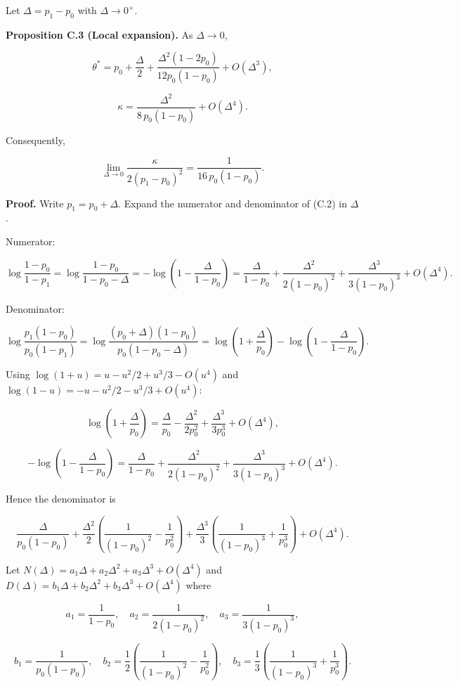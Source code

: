 \documentclass[
  12pt,
]{ctexart}
\begin{document}
Let \(\Delta = p_1 - p_0\) with \(\Delta \to 0^+\).

\textbf{Proposition C.3 (Local expansion).} As \(\Delta \to 0\),

\[
\theta^* = p_0 + \frac{\Delta}{2} + \frac{\Delta^2(1-2p_0)}{12 p_0(1-p_0)} + O(\Delta^3),
\]

\[
\kappa = \frac{\Delta^2}{8\,p_0(1-p_0)} + O(\Delta^4).
\]

Consequently,

\[
\lim_{\Delta\to 0} \frac{\kappa}{2(p_1-p_0)^2} = \frac{1}{16\,p_0(1-p_0)}.
\]

\textbf{Proof.} Write \(p_1 = p_0 + \Delta\). Expand the numerator and
denominator of (C.2) in \(\Delta\).

Numerator:

\[
\log\frac{1-p_0}{1-p_1} = \log\frac{1-p_0}{1-p_0-\Delta}
= -\log\!\left(1 - \frac{\Delta}{1-p_0}\right)
= \frac{\Delta}{1-p_0} + \frac{\Delta^2}{2(1-p_0)^2} + \frac{\Delta^3}{3(1-p_0)^3} + O(\Delta^4).
\]

Denominator:

\[
\log\frac{p_1(1-p_0)}{p_0(1-p_1)}
= \log\frac{(p_0+\Delta)(1-p_0)}{p_0(1-p_0-\Delta)}
= \log\!\left(1+\frac{\Delta}{p_0}\right) - \log\!\left(1-\frac{\Delta}{1-p_0}\right).
\]

Using \(\log(1+u) = u - u^2/2 + u^3/3 - O(u^4)\) and
\(\log(1-u) = -u - u^2/2 - u^3/3 + O(u^4)\):

\[
\log\!\left(1+\frac{\Delta}{p_0}\right) = \frac{\Delta}{p_0} - \frac{\Delta^2}{2p_0^2} + \frac{\Delta^3}{3p_0^3} + O(\Delta^4),
\]

\[
-\log\!\left(1-\frac{\Delta}{1-p_0}\right) = \frac{\Delta}{1-p_0} + \frac{\Delta^2}{2(1-p_0)^2} + \frac{\Delta^3}{3(1-p_0)^3} + O(\Delta^4).
\]

Hence the denominator is

\[
\frac{\Delta}{p_0(1-p_0)} + \frac{\Delta^2}{2}\!\left(\frac{1}{(1-p_0)^2} - \frac{1}{p_0^2}\right) + \frac{\Delta^3}{3}\!\left(\frac{1}{(1-p_0)^3} + \frac{1}{p_0^3}\right) + O(\Delta^4).
\]

Let \(N(\Delta) = a_1\Delta + a_2\Delta^2 + a_3\Delta^3 + O(\Delta^4)\)
and \(D(\Delta) = b_1\Delta + b_2\Delta^2 + b_3\Delta^3 + O(\Delta^4)\)
where

\[
a_1 = \frac{1}{1-p_0},\quad
a_2 = \frac{1}{2(1-p_0)^2},\quad
a_3 = \frac{1}{3(1-p_0)^3},
\]

\[
b_1 = \frac{1}{p_0(1-p_0)},\quad
b_2 = \frac{1}{2}\!\left(\frac{1}{(1-p_0)^2} - \frac{1}{p_0^2}\right),\quad
b_3 = \frac{1}{3}\!\left(\frac{1}{(1-p_0)^3} + \frac{1}{p_0^3}\right).
\]
\end{document}
